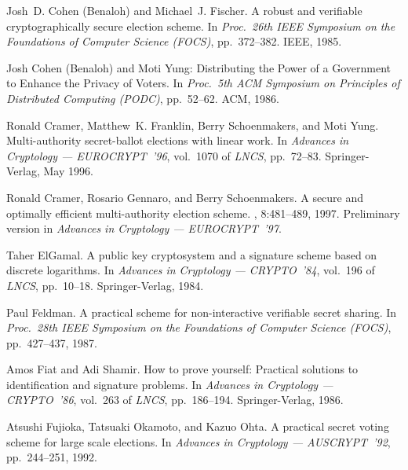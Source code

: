 \documentclass{article}
\begin{document}
\begin{thebibliography}{[CDNO97]}
Josh~D. Cohen (Benaloh) and Michael~J. Fischer.
\newblock A robust and verifiable cryptographically secure election
  scheme.
\newblock In {\em Proc.~26th {IEEE} Symposium on the Foundations of 
  Computer Science ({FOCS})}, pp.~372--382. IEEE, 1985.

Josh Cohen (Benaloh) and Moti Yung:
\newblock Distributing the Power of a Government to Enhance the Privacy of
  Voters.
\newblock In {\em Proc.~5th {ACM} Symposium on Principles of Distributed
  Computing ({PODC})}, pp.~52--62.
  ACM, 1986.

Ronald Cramer, Matthew~K. Franklin, Berry Schoenmakers, and Moti Yung.
\newblock Multi-authority secret-ballot elections with linear work.
\newblock In {\em Advances in Cryptology --- {EUROCRYPT}~'96},
  vol.~1070 of {\em LNCS}, pp.~72--83.
  {Springer-Verlag}, May 1996.

Ronald Cramer, Rosario Gennaro, and Berry Schoenmakers.
\newblock A secure and optimally efficient multi-authority election
  scheme.
, 8:481--489,
  1997.
  Preliminary version in {\em Advances in Cryptology --- {EUROCRYPT}~'97}.

Taher ElGamal.
\newblock A public key cryptosystem and a signature scheme based on 
  discrete logarithms.
\newblock In {\em Advances in Cryptology --- {CRYPTO}~'84},
  vol.~196 of {\em LNCS}, pp.~10--18.
  {Springer-Verlag}, 1984.

Paul Feldman.
\newblock A practical scheme for non-interactive verifiable secret sharing.
\newblock In {\em Proc.~28th {IEEE} Symposium on the Foundations of Computer
  Science ({FOCS})}, pp.~427--437, 1987.

Amos Fiat and Adi Shamir.
\newblock How to prove yourself: Practical solutions to identification
  and signature problems.
\newblock In {\em Advances in Cryptology --- {CRYPTO}~'86},
  vol.~263 of {\em LNCS}, pp.~186--194.
  {Springer-Verlag}, 1986.

Atsushi Fujioka, Tatsuaki Okamoto, and Kazuo Ohta.
\newblock A practical secret voting scheme for large scale elections.
\newblock In {\em Advances in Cryptology --- {AUSCRYPT}~'92},
  pp.~244--251, 1992.


\end{thebibliography}
\end{document}
